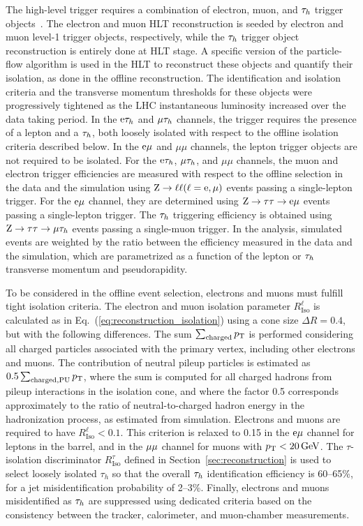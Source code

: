 \documentclass[12pt,twoside,a4paper,cmspaper,final,collab]{cms-tdr}
\begin{document}
The high-level trigger requires a combination of electron, muon, and $\tau_h$ trigger objects~\cite{CMS-PAS-EGM-10-004,CMS-PAS-MUO-10-002,CMS-EWK-TAU}.
The electron and muon HLT reconstruction is seeded by electron and muon level-1 trigger objects, respectively,
while the $\tau_h$ trigger object reconstruction is entirely done at HLT stage.
A specific version of the particle-flow algorithm is used in the HLT to reconstruct these objects and quantify their isolation, as done in the offline reconstruction.
The identification and isolation criteria and the transverse momentum
thresholds for these objects were progressively
tightened as the LHC instantaneous luminosity increased over the data taking period.
In the $\mathrm{e}\tau_h$ and ${\mu}\tau_h$ channels, the trigger requires the presence of a lepton and a $\tau_h$,
both loosely isolated with respect to the offline isolation criteria described below.
In the $\mathrm{e}\mu$ and $\mu\mu$ channels, the lepton trigger objects are not required to be isolated.
For the $\mathrm{e}\tau_h$, ${\mu}\tau_h$, and $\mu\mu$ channels, the muon and electron trigger efficiencies
are measured with respect to the offline selection  in the data and the simulation using $\mathrm{Z}\to \ell\ell (\ell=\mathrm{e},{\mu})$ events passing a single-lepton trigger.
For the $\mathrm{e}\mu$ channel, they are determined using $\mathrm{Z} \to \tau\tau \to \mathrm{e} \mu $ events passing a single-lepton trigger.
The $\tau_h$ triggering efficiency is obtained using $\mathrm{Z} \to \tau\tau \to \mu \tau_h$ events passing a single-muon trigger.
In the analysis, simulated events are weighted by the ratio between the efficiency measured in the data and the simulation,
which are parametrized as a function of the lepton or $\tau_h$ transverse momentum and pseudorapidity.

To be considered in the offline event selection, electrons and muons must fulfill tight isolation criteria.
The electron and muon isolation parameter $R_\text{Iso}^{\ell}$ is calculated as in Eq.~(\ref{eq:reconstruction_isolation}) using a cone size $\Delta R=0.4$, but with the following differences.
The sum $\sum_\text{charged}  p_{\mathrm{T}}$ is performed considering all charged particles associated with the primary vertex, including other electrons and muons.
The contribution of neutral  pileup particles is estimated as $0.5 \sum_{\rm charged, PU} p_{\mathrm{T}}$,
where the sum is computed for all charged hadrons from pileup interactions in the isolation cone,
and where the factor 0.5 corresponds approximately to the ratio of neutral-to-charged
hadron energy in the hadronization process, as estimated from simulation.
Electrons and muons are required to have $R_\text{Iso}^{\ell}<0.1$.
This criterion is relaxed to 0.15 in the $\mathrm{e}{\mu}$ channel for leptons in the barrel,
and in the ${\mu}{\mu}$ channel for muons with $p_{\mathrm{T}}<20\,\text{Ge\hspace{-.08em}V}$.
The $\tau$-isolation discriminator $R_\text{Iso}^{\tau}$ defined in Section~\ref{sec:reconstruction} is used to select loosely isolated $\tau_h$
so that the overall $\tau_h$ identification efficiency is 60--65\%,
for a jet misidentification probability of 2--3\%.
Finally, electrons and muons misidentified as $\tau_h$ are suppressed
using dedicated criteria based on the consistency between the tracker, calorimeter, and muon-chamber measurements.
\end{document}
